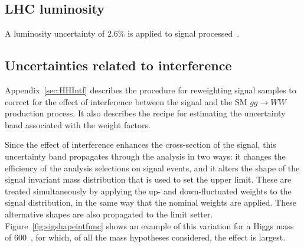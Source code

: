

\subsection{LHC luminosity}

A luminosity uncertainty of 2.6\% is applied to signal processed~\cite{lumiPAS}.

\subsection{Uncertainties related to interference }

Appendix~\ref{sec:HHIntf} describes the procedure for reweighting
signal samples to correct for the effect of interference between the
signal and the SM $gg \to WW$ production process. It also describes
the recipe for estimating the uncertainty band associated with the
weight factors. 

Since the effect of interference enhances the cross-section of the
signal, this uncertainty band propagates through the analysis in two
ways: it changes the efficiency of the analysis selections on signal
events, and it alters the shape of the signal invariant mass
distribution that is used to set the upper limit. These are treated
simultaneously by applying the up- and down-fluctuated weights to the
signal distribution, in the same way that the nominal weights are
applied. These alternative shapes are also propagated to the limit setter.
Figure~\ref{fig:sigshapeintfunc} shows an example of this variation
for a Higgs mass of 600~\GeV, for which, of all the mass hypotheses
considered, the effect is largest.

